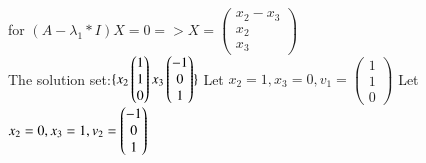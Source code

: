 \documentclass{article}
\begin{document}
for $(A-\lambda_1*I)X=0=>X=
\left(\begin{matrix}
x_2-x_3 \\
x_2 \\
x_3
\end{matrix}\right)$
\\The solution set:$\{x_2\left(\begin{matrix}1 \\ 1 \\ 0\end{matrix}\right)
                  x_3\left(\begin{matrix}-1 \\ 0 \\ 1\end{matrix}\right)
                  \}\\$
Let $x_2=1, x_3=0, v_1=\left(\begin{matrix}1 \\ 1 \\ 0\end{matrix}\right)$
Let $x_2=0, x_3=1, v_2=\left(\begin{matrix}-1 \\ 0 \\ 1\end{matrix}\right)\\$
\end{document}
